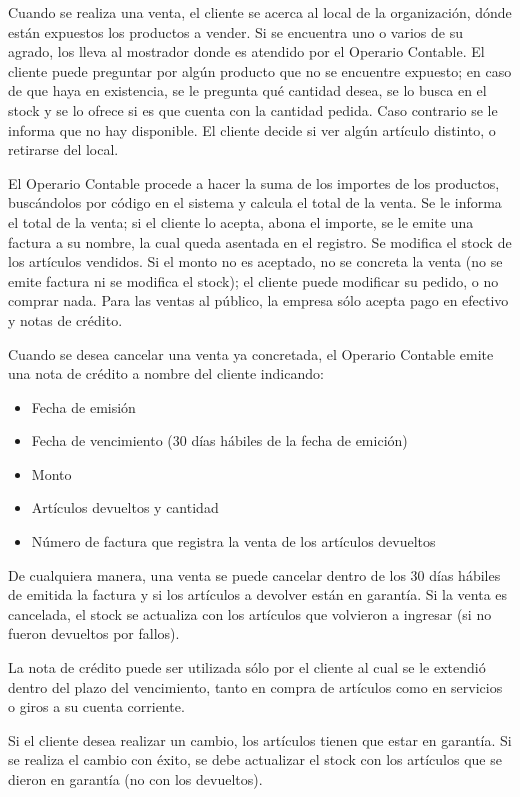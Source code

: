 \documentclass[12pt]{extarticle}
\begin{document}
\begin{spacing}{1.2}
    Cuando se realiza una venta, el cliente se acerca al local de la organización, dónde están expuestos los productos a vender. Si se encuentra uno o varios de su agrado, los lleva al mostrador donde es atendido por el Operario Contable. 
    El cliente puede preguntar por algún producto que no se encuentre expuesto; en caso de que haya en existencia, se le pregunta qué cantidad desea, se lo busca en el stock y se lo ofrece si es que cuenta con la cantidad pedida. Caso contrario se le informa que no hay disponible. El cliente decide si ver algún artículo distinto, o retirarse del local.

    El Operario Contable procede a hacer la suma de los importes de los productos, buscándolos por código en el sistema y calcula el total de la venta. Se le informa el total de la venta; si el cliente lo acepta, abona el importe, se le emite una factura a su nombre, la cual queda asentada en el registro. Se modifica el stock de los artículos vendidos. 
    Si el monto no es aceptado, no se concreta la venta (no se emite factura ni se modifica el stock); el cliente puede modificar su pedido, o no comprar nada.
    Para las ventas al público, la empresa sólo acepta pago en efectivo y notas de crédito.

    Cuando se desea cancelar una venta ya concretada, el Operario Contable emite una nota de crédito a nombre del cliente indicando:
    \begin{itemize}
        \item Fecha de emisión
        \item Fecha de vencimiento (30 días hábiles de la fecha de emición)
        \item Monto
        \item Artículos devueltos y cantidad
        \item Número de factura que registra la venta de los artículos devueltos
    \end{itemize}
    De cualquiera manera, una venta se puede cancelar dentro de los 30 días hábiles de emitida la factura y si los artículos a devolver están en garantía. Si la venta es cancelada, el stock se actualiza con los artículos que volvieron a ingresar (si no fueron devueltos por fallos).

    La nota de crédito puede ser utilizada sólo por el cliente al cual se le extendió dentro del plazo del vencimiento, tanto en compra de artículos como en servicios o giros a su cuenta corriente.

    Si el cliente desea realizar un cambio, los artículos tienen que estar en garantía. Si se realiza el cambio con éxito, se debe actualizar el stock con los artículos que se dieron en garantía (no con los devueltos).


\end{spacing}
\end{document}
